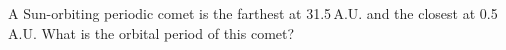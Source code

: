 A Sun-orbiting periodic comet is the farthest at 31.5\,A.U. and the closest at
0.5\,A.U. What is the orbital period of this comet?
